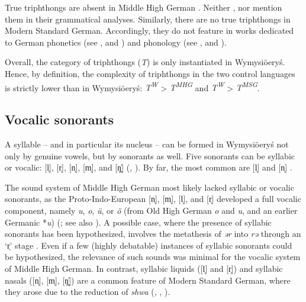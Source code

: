 \documentclass[output=paper,hidelinks]{langscibook}
\begin{document}
True triphthongs are absent in Middle High German \citep[10]{hall_underlying_2017}. Neither \citet{wright_middle_1917, de_boor_mittelhochdeutsche_1973, simmler_phonetik_1985, paul_mittelhochdeutsche_2007}, nor \citet{schmidt_einfuhrung_2017} mention them in their grammatical analyses. Similarly, there are no true triphthongs in Modern Standard German. Accordingly, they do not feature in works dedicated to German phonetics (see \citealt{eisenberg_german_1994, johnson_exploring_2008, fagan_german_2009}, and \citealt{obrein_german_2016}) and phonology (see \citealt{russ_german_1994, wiese_phonology_1996}, and \citealt{fox_structure_2005}).%

Overall, the category of triphthongs (\textit{T}) is only instantiated in Wymysiöeryś. Hence, by definition, the complexity of triphthongs in the two control languages is strictly lower than in Wymysiöeryś: \textit{T\textsuperscript{W}} > \textit{T\textsuperscript{MHG} }and \textit{T\textsuperscript{W}} > \textit{T\textsuperscript{MSG}}.

\subsection{Vocalic sonorants}\label{sec:wymsorys:3.4}
\largerpage[-1]

A syllable – and in particular its nucleus – can be formed in Wymysiöeryś not only by genuine vowels, but by sonorants as well. Five sonorants can be syllabic or vocalic: [l̩], [r̩], [n̩], [m̩], and [ŋ̬̍] (\citealt[12]{kleczkowski_dialekt_1920}, \citealt[xiii]{mojmir_worterbuch}). By far, the most common are [l̩] and [n̩] \citep{Andrason2021}.


The sound system of Middle High German most likely lacked syllabic or vocalic sonorants, as the Proto-Indo-European [n̩], [m̩], [l̩], and [r̩] developed a full vocalic component, namely \textit{u}, \textit{o}, \textit{ü}, or \textit{ö} (from Old High German \textit{o} and \textit{u}, and an earlier Germanic *\textit{u}) (\citealt[62, 66, 146--150]{paul_mittelhochdeutsche_2007}; see also \citealt[48]{de_boor_mittelhochdeutsche_1973}). A possible case, where the presence of syllabic sonorants has been hypothesized, involves the metathesis of \textit{ər} into \textit{rə} through an `r̩' stage \citep[147]{paul_mittelhochdeutsche_2007}. Even if a few (highly debatable) instances of syllabic sonorants could be hypothesized, the relevance of such sounds was minimal for the vocalic system of Middle High German. In contrast, syllabic liquids ([l̩] and [r̩]) and syllabic nasals ([n̩], [m̩], [ŋ̬̍]) are a common feature of Modern Standard German, where they arose due to the reduction of \textit{shwa} (\citealt[24, 32]{fagan_german_2009}, \citealt[130--131]{johnson_exploring_2008}, \citealt[18]{obrein_german_2016}). %
\end{document}
